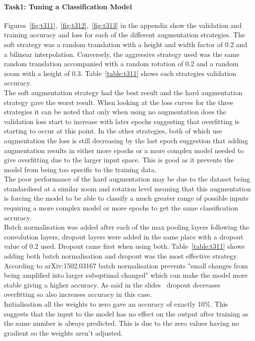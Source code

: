 \documentclass[10pt,twocolumn,letterpaper]{article}
\begin{document}
\paragraph{Task1: Tuning a Classification Model}
Figures~\ref{fig:t311},~\ref{fig:t312},~\ref{fig:t313} in the appendix show the validation and training accuracy and loss for each of the different augmentation strategies.
The soft strategy was a random translation with a height and width factor of 0.2 and a bilinear interpolation. Conversely, the aggressive strategy used was the same random translation accompanied with a random rotation of 0.2 and a random zoom with a height of 0.3. Table~\ref{table:t311} shows each strategies validation accuracy. \\
The soft augmentation strategy had the best result and the hard augmentation strategy gave the worst result. When looking at the loss curves for the three strategies it can be noted that only when using no augmentation does the validation loss start to increase with later epochs suggesting that overfitting is starting to occur at this point. In the other strategies, both of which use augmentation the loss is still decreasing by the last epoch suggestion that adding augmentation results in either more epochs or a more complex model needed to give overfitting due to the larger input space. This is good as it prevents the model from being too specific to the training data. \\
The poor performance of the hard augmentation may be due to the dataset being standardised at a similar zoom and rotation level meaning that this augmentation is forcing the model to be able to classify a much greater range of possible inputs requiring a more complex model or more epochs to get the same classification accuracy. \\
Batch normalisation was added after each of the max pooling layers following the convolution layers, dropout layers were added in the same place with a dropout value of 0.2 used. Dropout came first when using both. Table~\ref{table:t311} shows adding both batch normalisation and dropout was the most effective strategy. According to arXiv:1502.03167\cite{normalisation} batch normalisation prevents "small changes from being amplified into larger suboptimal changed" which can make the model more stable giving a higher accuracy. As said in the slides~\cite{slides3} dropout decreases overfitting so also increases accuracy in this case.
\\
Initialisation all the weights to zero gave an accuracy of exactly 10\%. This suggests that the input to the model has no effect on the output after training as the same number is always predicted. This is due to the zero values having no gradient so the weights aren't adjusted. 
\end{document}
